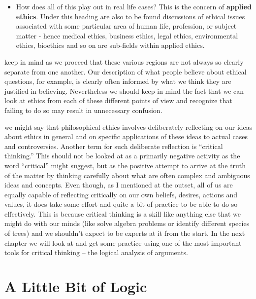 \documentclass[justified]{tufte-book}
\providecommand{\tightlist}{%
  \setlength{\itemsep}{0pt}\setlength{\parskip}{0pt}}
\begin{document}
\begin{itemize}
\tightlist
\item
  How does all of this play out in real life cases? This is the concern of \textbf{applied ethics}. Under this heading are also to be found discussions of ethical issues associated with some particular area of human life, profession, or subject matter - hence medical ethics, business ethics, legal ethics, environmental ethics, bioethics and so on are sub-fields within applied ethics.
\end{itemize}

 keep in mind as we proceed that these various regions are not always so clearly separate from one another. Our description of what people believe about ethical questions, for example, is clearly often informed by what we think they are justified in believing. Nevertheless we should keep in mind the fact that we can look at ethics from each of these different points of view and recognize that failing to do so may result in unnecessary confusion.

 we might say that philosophical ethics involves deliberately reflecting on our ideas about ethics in general and on specific applications of these ideas to actual cases and controversies. Another term for such deliberate reflection is ``critical thinking.'' This should not be looked at as a primarily negative activity as the word ``critical'' might suggest, but as the positive attempt to arrive at the truth of the matter by thinking carefully about what are often complex and ambiguous ideas and concepts. Even though, as I mentioned at the outset, all of us are equally capable of reflecting critically on our own beliefs, desires, actions and values, it does take some effort and quite a bit of practice to be able to do so effectively. This is because critical thinking is a skill like anything else that we might do with our minds (like solve algebra problems or identify different species of trees) and we shouldn't expect to be experts at it from the start. In the next chapter we will look at and get some practice using one of the most important tools for critical thinking -- the logical analysis of arguments.

\hypertarget{a-little-bit-of-logic}{%
\chapter{A Little Bit of Logic}\label{a-little-bit-of-logic}}
\end{document}
